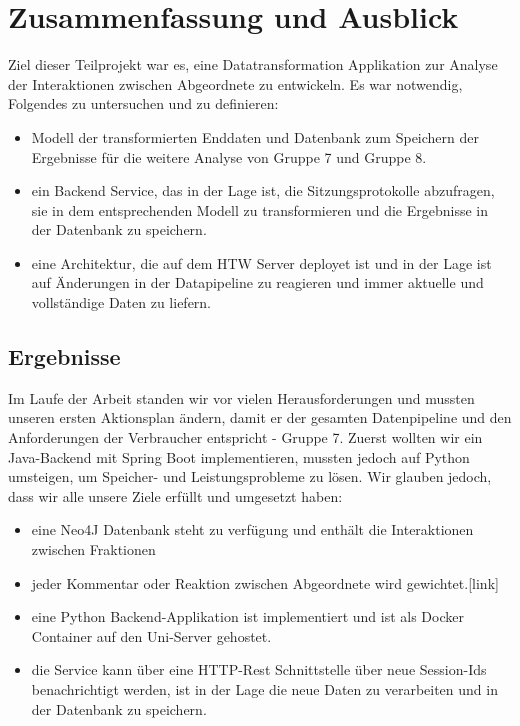 \documentclass{article}
\begin{document}
\section{Zusammenfassung und Ausblick}\label{sec:06_05_zusammenfassung}
Ziel dieser Teilprojekt war es, eine Datatransformation Applikation zur Analyse der Interaktionen zwischen Abgeordnete zu entwickeln. Es war notwendig, Folgendes zu untersuchen und zu definieren:
\begin{itemize}
  \item Modell der transformierten Enddaten und Datenbank zum Speichern der Ergebnisse für die weitere Analyse von Gruppe 7 und Gruppe 8. 
  \item ein Backend Service, das in der Lage ist, die Sitzungsprotokolle abzufragen, sie in dem entsprechenden Modell zu transformieren und die Ergebnisse in der Datenbank zu speichern.
  \item eine Architektur, die auf dem HTW Server deployet ist und in der Lage ist auf Änderungen in der Datapipeline zu reagieren und immer aktuelle und vollständige Daten zu liefern. 
\end{itemize}

\subsection{Ergebnisse}
Im Laufe der Arbeit standen wir vor vielen Herausforderungen und mussten unseren ersten Aktionsplan ändern, damit er der gesamten Datenpipeline und den Anforderungen der Verbraucher entspricht - Gruppe 7. Zuerst wollten wir ein Java-Backend mit Spring Boot implementieren, mussten jedoch auf Python umsteigen, um Speicher- und Leistungsprobleme zu lösen. Wir glauben jedoch, dass wir alle unsere Ziele erfüllt und umgesetzt haben:
\begin{itemize}
    \item eine Neo4J Datenbank steht zu verfügung und enthält die Interaktionen zwischen Fraktionen
    \item jeder Kommentar oder Reaktion zwischen Abgeordnete wird gewichtet.[link] 
    \item eine Python Backend-Applikation ist implementiert und ist als Docker Container auf den Uni-Server gehostet.
    \item die Service kann über eine HTTP-Rest Schnittstelle über neue Session-Ids  benachrichtigt werden, ist in der Lage die neue Daten zu verarbeiten und in der Datenbank zu speichern.
\end{itemize}
\end{document}
